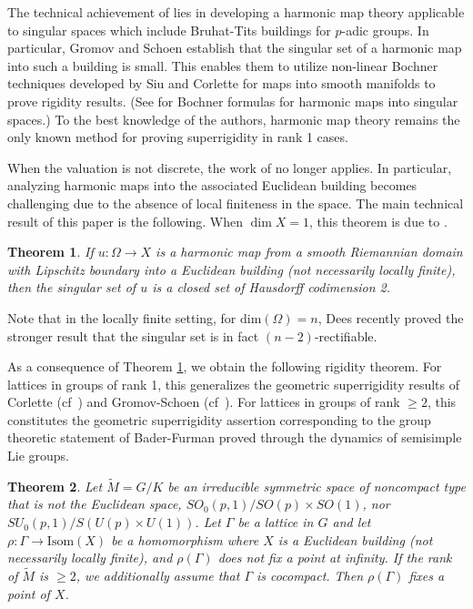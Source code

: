 \documentclass[12pt]{amsart}
\newtheorem{theorem}{Theorem}[section]
\theoremstyle{definition}
\numberwithin{equation}{section}
\begin{document}
The technical achievement of \cite{gromov-schoen} lies in  developing a harmonic map theory applicable to singular spaces which include Bruhat-Tits buildings {for $p$-adic groups}. In particular, Gromov and Schoen establish that the singular set of a harmonic map into {such a building} is small. This enables them to utilize non-linear Bochner techniques developed by Siu \cite{siu} and Corlette \cite{corlette} {for maps into smooth manifolds} to prove rigidity results.
 {(See \cite{freidin,freidin-zhang,zhang-zhong-zhu} for Bochner formulas for harmonic maps into singular spaces.)} 
To the best knowledge of the authors, harmonic map theory remains the only known method for proving superrigidity in rank 1 cases. 


When the valuation is not discrete, the work of \cite{gromov-schoen} no longer applies. In particular, analyzing harmonic maps into the associated Euclidean building becomes challenging due to the absence of local finiteness in the space.  
The main technical result of this paper is the following.  When $\dim X=1$,  this theorem is due to   \cite{sun}.


\begin{theorem} \label{maintechnical}
If $u:\Omega \rightarrow X$ is a harmonic map from a smooth Riemannian domain with Lipschitz boundary into a Euclidean building (not necessarily locally finite), then the singular set of $u$ is {a closed set} of Hausdorff codimension 2. 
\end{theorem}
 {Note that in the locally finite setting, for $\text{dim}(\Omega)=n$, Dees \cite{dees} recently proved the stronger result that the singular set is in fact $(n-2)$-rectifiable.}
 

 As a consequence of Theorem \ref{maintechnical}, we obtain the following rigidity theorem.  For lattices in groups of rank 1, this  generalizes the geometric superrigidity results of  Corlette (cf~\cite{corlette}) and Gromov-Schoen (cf~\cite{gromov-schoen}).   For  lattices in groups of rank $\geq 2$, this constitutes the geometric superrigidity assertion corresponding to the group theoretic statement of Bader-Furman \cite{bader-furman} proved through the   dynamics of semisimple Lie groups. 
 
  \begin{theorem} \label{maintheorem}
 Let $\widetilde M= G \slash K$ be an irreducible symmetric space of noncompact type that is not the Euclidean space, 
 $SO_0(p,1) \slash SO(p) \times SO(1)$, nor $SU_0(p,1) \slash S(U(p) \times U(1))$.
  Let 
 $\Gamma$ be a lattice in $G$  and let $\rho: \Gamma \rightarrow \text{Isom}(X)$ be a homomorphism where $X$ is a Euclidean building (not necessarily locally finite), {and $\rho(\Gamma)$ does not fix a point at infinity}. If the rank of $\widetilde M$ is $\geq 2$, we additionally assume that $\Gamma$ is cocompact. 
 Then $\rho(\Gamma)$ fixes a point of $X$.
  \end{theorem}
   
\end{document}

